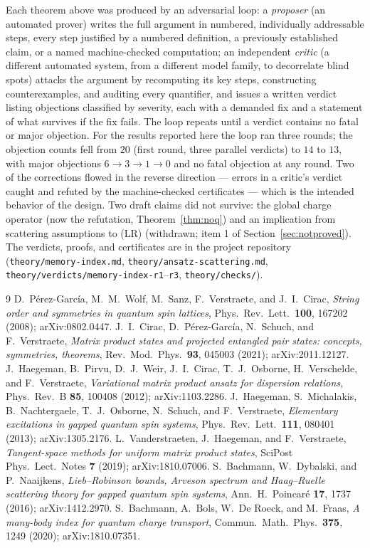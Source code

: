 \documentclass[11pt]{article}
\theoremstyle{definition}
\theoremstyle{remark}
\begin{document}
Each theorem above was produced by an adversarial loop: a \emph{proposer}
(an automated prover) writes the full argument in numbered, individually
addressable steps, every step justified by a numbered definition, a
previously established claim, or a named machine-checked computation; an
independent \emph{critic} (a different automated system, from a different
model family, to decorrelate blind spots) attacks the argument by
recomputing its key steps, constructing counterexamples, and auditing every
quantifier, and issues a written verdict listing objections classified by
severity, each with a demanded fix and a statement of what survives if the
fix fails.  The loop repeats until a verdict contains no fatal or major
objection.  For the results reported here the loop ran three rounds; the
objection counts fell from $20$ (first round, three parallel verdicts) to
$14$ to $13$, with major objections $6\to3\to1\to0$ and no fatal objection
at any round.  Two of the corrections flowed in the reverse direction ---
errors in a critic's verdict caught and refuted by the machine-checked
certificates --- which is the intended behavior of the design.  Two draft
claims did not survive: the global charge operator (now the refutation,
Theorem~\ref{thm:noq}) and an implication from scattering assumptions to
(LR) (withdrawn; item 1 of Section~\ref{sec:notproved}).  The verdicts,
proofs, and certificates are in the project repository
(\texttt{theory/memory-index.md}, \texttt{theory/ansatz-scattering.md},
\texttt{theory/verdicts/memory-index-r1}--\texttt{r3},
\texttt{theory/checks/}).

\begin{thebibliography}{9}
 D.~P\'erez-Garc\'ia, M.~M.~Wolf, M.~Sanz, F.~Verstraete,
and J.~I.~Cirac, \emph{String order and symmetries in quantum spin lattices},
Phys.\ Rev.\ Lett.\ \textbf{100}, 167202 (2008); arXiv:0802.0447.
 J.~I.~Cirac, D.~P\'erez-Garc\'ia, N.~Schuch, and
F.~Verstraete, \emph{Matrix product states and projected entangled pair
states: concepts, symmetries, theorems}, Rev.\ Mod.\ Phys.\ \textbf{93},
045003 (2021); arXiv:2011.12127.
 J.~Haegeman, B.~Pirvu, D.~J.~Weir, J.~I.~Cirac,
T.~J.~Osborne, H.~Verschelde, and F.~Verstraete, \emph{Variational matrix
product ansatz for dispersion relations}, Phys.\ Rev.\ B \textbf{85}, 100408
(2012); arXiv:1103.2286.
 J.~Haegeman, S.~Michalakis, B.~Nachtergaele,
T.~J.~Osborne, N.~Schuch, and F.~Verstraete, \emph{Elementary excitations in
gapped quantum spin systems}, Phys.\ Rev.\ Lett.\ \textbf{111}, 080401
(2013); arXiv:1305.2176.
 L.~Vanderstraeten, J.~Haegeman, and
F.~Verstraete, \emph{Tangent-space methods for uniform matrix product
states}, SciPost Phys.\ Lect.\ Notes \textbf{7} (2019); arXiv:1810.07006.
 S.~Bachmann, W.~Dybalski, and P.~Naaijkens,
\emph{Lieb--Robinson bounds, Arveson spectrum and Haag--Ruelle scattering
theory for gapped quantum spin systems}, Ann.\ H.\ Poincar\'e \textbf{17},
1737 (2016); arXiv:1412.2970.
 S.~Bachmann, A.~Bols, W.~De Roeck, and M.~Fraas,
\emph{A many-body index for quantum charge transport}, Commun.\ Math.\
Phys.\ \textbf{375}, 1249 (2020); arXiv:1810.07351.
\end{thebibliography}
\end{document}

